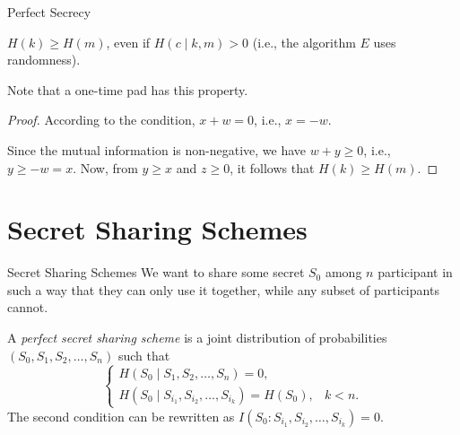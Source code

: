\documentclass[aspectratio=169]{beamer}
\newcommand{\seqn}[2]{{#1}_1,{#1}_2,\dotsc,{#1}_{#2}}
\newcommand{\seqin}[3]{{#1}_{{#2}_1},{#1}_{{#2}_2},\dotsc,{#1}_{{#2}_{#3}}}
\begin{document}
\begin{frame}{Perfect Secrecy}
    \begin{theorem}[Shannon]
        $H(k) \ge H(m)$, even if $H(c \mid k, m) > 0$ (i.e., the algorithm $E$ uses randomness).
    \end{theorem}
    Note that a one-time pad has this property.
    \pause
    \begin{proof}
        According to the condition, $x + w = 0$, i.e., $x = -w$.

        \begin{center}
        \end{center}
        Since the mutual information is non-negative, we have $w + y \ge 0$, i.e.,
        $y \ge -w = x$. Now, from $y \ge x$ and $z \ge 0$, it follows that $H(k) \ge H(m)$.
    \end{proof}
\end{frame}

\section{Secret Sharing Schemes}
\begin{frame}{Secret Sharing Schemes}
    We want to share some secret $S_0$ among $n$ participant in such a way that they can only use it together, while any subset of participants cannot.

    \begin{definition}
        A \emph{perfect secret sharing scheme} is a joint distribution of probabilities $(S_0, \seqn{S}{n})$ such that
        \[
        \begin{cases}
            H(S_0 \mid \seqn{S}{n}) = 0,\\
            H(S_0 \mid \seqin{S}{i}{k}) = H(S_0), & k < n.
        \end{cases}
        \]
        The second condition can be rewritten as $I(S_0 : \seqin{S}{i}{k}) = 0$.
    \end{definition}
\end{frame}
\end{document}
